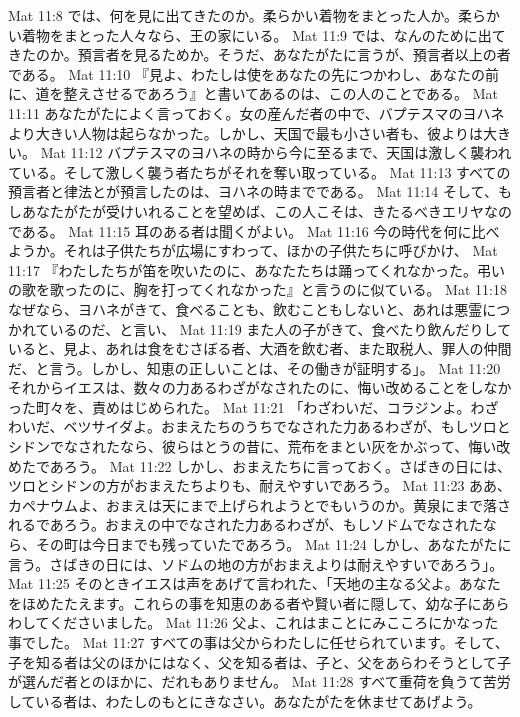 Mat 11:8  では、何を見に出てきたのか。柔らかい着物をまとった人か。柔らかい着物をまとった人々なら、王の家にいる。
Mat 11:9  では、なんのために出てきたのか。預言者を見るためか。そうだ、あなたがたに言うが、預言者以上の者である。
Mat 11:10  『見よ、わたしは使をあなたの先につかわし、あなたの前に、道を整えさせるであろう』と書いてあるのは、この人のことである。
Mat 11:11  あなたがたによく言っておく。女の産んだ者の中で、バプテスマのヨハネより大きい人物は起らなかった。しかし、天国で最も小さい者も、彼よりは大きい。
Mat 11:12  バプテスマのヨハネの時から今に至るまで、天国は激しく襲われている。そして激しく襲う者たちがそれを奪い取っている。
Mat 11:13  すべての預言者と律法とが預言したのは、ヨハネの時までである。
Mat 11:14  そして、もしあなたがたが受けいれることを望めば、この人こそは、きたるべきエリヤなのである。
Mat 11:15  耳のある者は聞くがよい。
Mat 11:16  今の時代を何に比べようか。それは子供たちが広場にすわって、ほかの子供たちに呼びかけ、
Mat 11:17  『わたしたちが笛を吹いたのに、あなたたちは踊ってくれなかった。弔いの歌を歌ったのに、胸を打ってくれなかった』と言うのに似ている。
Mat 11:18  なぜなら、ヨハネがきて、食べることも、飲むこともしないと、あれは悪霊につかれているのだ、と言い、
Mat 11:19  また人の子がきて、食べたり飲んだりしていると、見よ、あれは食をむさぼる者、大酒を飲む者、また取税人、罪人の仲間だ、と言う。しかし、知恵の正しいことは、その働きが証明する」。
Mat 11:20  それからイエスは、数々の力あるわざがなされたのに、悔い改めることをしなかった町々を、責めはじめられた。
Mat 11:21  「わざわいだ、コラジンよ。わざわいだ、ベツサイダよ。おまえたちのうちでなされた力あるわざが、もしツロとシドンでなされたなら、彼らはとうの昔に、荒布をまとい灰をかぶって、悔い改めたであろう。
Mat 11:22  しかし、おまえたちに言っておく。さばきの日には、ツロとシドンの方がおまえたちよりも、耐えやすいであろう。
Mat 11:23  ああ、カペナウムよ、おまえは天にまで上げられようとでもいうのか。黄泉にまで落されるであろう。おまえの中でなされた力あるわざが、もしソドムでなされたなら、その町は今日までも残っていたであろう。
Mat 11:24  しかし、あなたがたに言う。さばきの日には、ソドムの地の方がおまえよりは耐えやすいであろう」。
Mat 11:25  そのときイエスは声をあげて言われた、「天地の主なる父よ。あなたをほめたたえます。これらの事を知恵のある者や賢い者に隠して、幼な子にあらわしてくださいました。
Mat 11:26  父よ、これはまことにみこころにかなった事でした。
Mat 11:27  すべての事は父からわたしに任せられています。そして、子を知る者は父のほかにはなく、父を知る者は、子と、父をあらわそうとして子が選んだ者とのほかに、だれもありません。
Mat 11:28  すべて重荷を負うて苦労している者は、わたしのもとにきなさい。あなたがたを休ませてあげよう。
